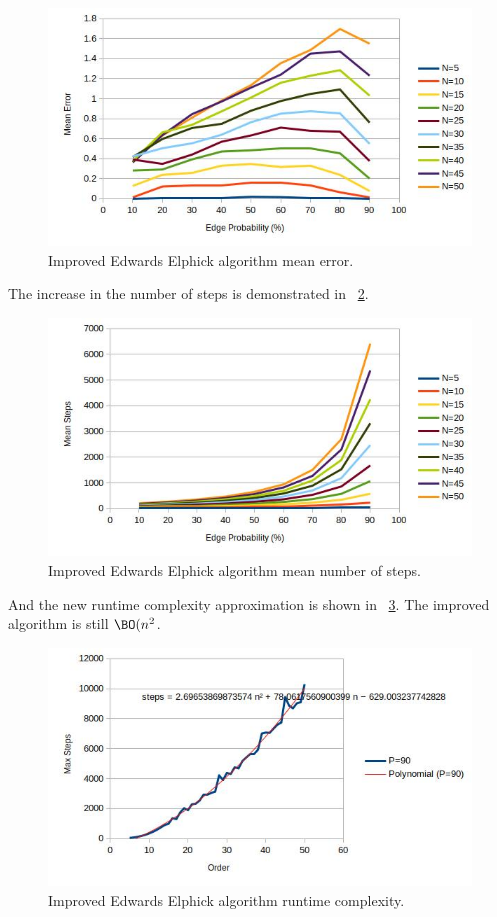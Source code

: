 \begin{figure}[H]
  \centering
  \includegraphics[width=5in]{edwards2_error}
  \caption{Improved Edwards Elphick algorithm mean error.}
  \label{fig:edwards2:error}
\end{figure}

The increase in the number of steps is demonstrated in \figurename~\ref{fig:edwards2:steps}.

\begin{figure}[H]
  \centering
  \includegraphics[width=5in]{edwards2_steps}
  \caption{Improved Edwards Elphick algorithm mean number of steps.}
  \label{fig:edwards2:steps}
\end{figure}

And the new runtime complexity approximation is shown in \figurename~\ref{fig:edwards2:runtime}.  The improved
algorithm is still \(\BO(n^2\).

\begin{figure}[H]
  \centering
  \includegraphics[width=5in]{edwards2_runtime}
  \caption{Improved Edwards Elphick algorithm runtime complexity.}
  \label{fig:edwards2:runtime}
\end{figure}


